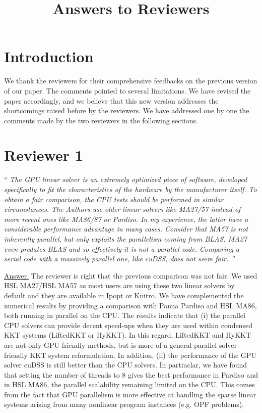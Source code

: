 \documentclass[10pt,a4paper]{article}
\newenvironment{quotereviewer}{\vspace{.5cm}{\underline\reviewername} ``\it\footnotesize}{''}
\newcommand{\answer}{\vspace{1mm}\underline{Answer.} }
\begin{document}
\title{\textbf{Answers to Reviewers}\\
}
\maketitle

\section*{Introduction}
We thank the reviewers for their comprehensive feedbacks on the previous
version of our paper. The comments pointed to several limitations.
We have revised the paper accordingly, and we believe that this new version addresses
the shortcomings raised before by the reviewers.
We have addressed one by one the comments made by the two reviewers in
the following sections.

\section{Reviewer 1}
\def\reviewername{Reviewer~\#1}
\bigskip

\begin{quotereviewer}
The GPU linear solver is an extremely optimized piece of software, developed specifically to fit the characteristics of the hardware by the manufacturer itself. To obtain a fair comparison, the CPU tests should be performed in similar circumstances.
The Authors use older linear solvers like MA27/57 instead of more recent ones like MA86/87 or Pardiso. In my experience, the latter have a considerable performance advantage in many cases. Consider that MA57 is not inherently parallel, but only exploits the parallelism coming from BLAS. MA27 even predates BLAS and so effectively it is not a parallel code. Comparing a serial code with a massively parallel one, like cuDSS, does not seem fair.
\end{quotereviewer}

\answer
The reviewer is right that the previous comparison was not fair. We used HSL MA27/HSL MA57 as most
users are using these two linear solvers by default and they are available in Ipopt or Knitro.
We have complemented the numerical results by providing a comparison with Panua Pardiso and HSL MA86, both running in parallel on the CPU.
The results indicate that
(i) the parallel CPU solvers can provide decent speed-ups when they are used within condensed KKT systems (LiftedKKT or HyKKT).
In this regard, LiftedKKT and HyKKT are not only GPU-friendly methods, but is more of a general parallel solver-friendly KKT system reformulation.
In addition, (ii) the performance of the GPU solver cuDSS is still better than the CPU solvers.
In partiuclar, we have found that setting the number of threads to 8 gives the best performance in Pardiso and in HSL MA86, the parallel
scalability remaining limited on the CPU.
This comes from the fact that GPU parallelism is more effective at handling the sparse linear systems arising from many nonlinear program instances (e.g. OPF problems). 
\end{document}
